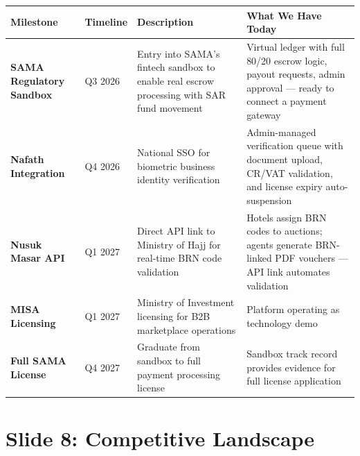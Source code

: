 \documentclass[11pt,a4paper]{article}
\begin{document}
\begin{center}
\begin{tabular}{|>{\raggedright\arraybackslash}p{2.2cm}|>{\raggedright\arraybackslash}p{1.5cm}|>{\raggedright\arraybackslash}p{4cm}|>{\raggedright\arraybackslash}p{5.8cm}|}
\hline
\rowcolor{headergray}
\textbf{Milestone} & \textbf{Timeline} & \textbf{Description} & \textbf{What We Have Today} \\
\hline
\textbf{SAMA Regulatory Sandbox} & Q3 2026 & Entry into SAMA's fintech sandbox to enable real escrow processing with SAR fund movement & Virtual ledger with full 80/20 escrow logic, payout requests, admin approval --- ready to connect a payment gateway \\
\hline
\textbf{Nafath Integration} & Q4 2026 & National SSO for biometric business identity verification & Admin-managed verification queue with document upload, CR/VAT validation, and license expiry auto-suspension \\
\hline
\textbf{Nusuk Masar API} & Q1 2027 & Direct API link to Ministry of Hajj for real-time BRN code validation & Hotels assign BRN codes to auctions; agents generate BRN-linked PDF vouchers --- API link automates validation \\
\hline
\textbf{MISA Licensing} & Q1 2027 & Ministry of Investment licensing for B2B marketplace operations & Platform operating as technology demo \\
\hline
\textbf{Full SAMA License} & Q4 2027 & Graduate from sandbox to full payment processing license & Sandbox track record provides evidence for full license application \\
\hline
\end{tabular}
\end{center}

\newpage

\section*{Slide 8: Competitive Landscape}
\end{document}

